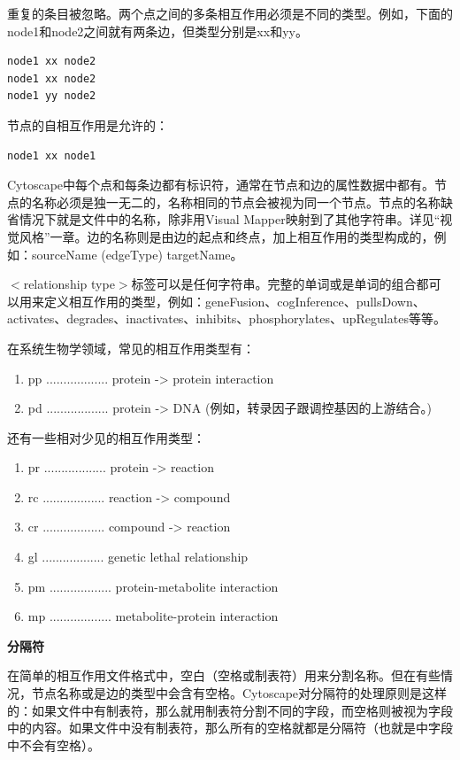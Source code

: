 重复的条目被忽略。两个点之间的多条相互作用必须是不同的类型。例如，下面的node1和node2之间就有两条边，但类型分别是xx和yy。
\begin{verbatim}
node1 xx node2
node1 xx node2
node1 yy node2
\end{verbatim}

节点的自相互作用是允许的：
\begin{verbatim}
node1 xx node1
\end{verbatim}

Cytoscape中每个点和每条边都有标识符，通常在节点和边的属性数据中都有。节点的名称必须是独一无二的，名称相同的节点会被视为同一个节点。节点的名称缺省情况下就是文件中的名称，除非用Visual Mapper映射到了其他字符串。详见``视觉风格''一章。边的名称则是由边的起点和终点，加上相互作用的类型构成的，例如：sourceName (edgeType) targetName。


$<$relationship type$>$标签可以是任何字符串。完整的单词或是单词的组合都可以用来定义相互作用的类型，例如：geneFusion、cogInference、pullsDown、activates、degrades、inactivates、inhibits、phosphorylates、upRegulates等等。 

在系统生物学领域，常见的相互作用类型有：
\begin{enumerate}
\item  pp .................. protein -> protein interaction
\item  pd .................. protein -> DNA   
  (例如，转录因子跟调控基因的上游结合。)
\end{enumerate}

还有一些相对少见的相互作用类型：
\begin{enumerate}
\item  pr .................. protein -> reaction
\item  rc .................. reaction -> compound
\item  cr .................. compound -> reaction
\item  gl .................. genetic lethal relationship
\item  pm .................. protein-metabolite interaction
\item  mp .................. metabolite-protein interaction
\end{enumerate}


\textbf{分隔符}

在简单的相互作用文件格式中，空白（空格或制表符）用来分割名称。但在有些情况，节点名称或是边的类型中会含有空格。Cytoscape对分隔符的处理原则是这样的：如果文件中有制表符，那么就用制表符分割不同的字段，而空格则被视为字段中的内容。如果文件中没有制表符，那么所有的空格就都是分隔符（也就是中字段中不会有空格）。

